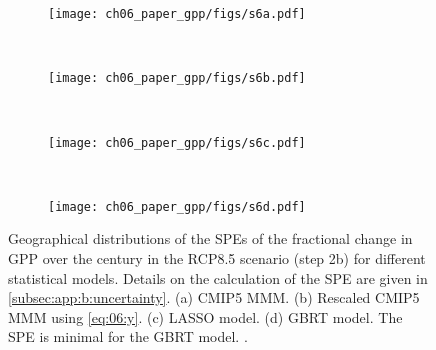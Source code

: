 \begin{figure}[p]
  \centering
  \begin{subfigure}[b]{\SubfigureWidth{}}
    \texttt{[image: ch06\_paper\_gpp/figs/s6a.pdf]}
    \caption{}
    \label{fig:app:b:step2b_results_errors:a}
  \end{subfigure}
  ~
  \begin{subfigure}[b]{\SubfigureWidth{}}
    \texttt{[image: ch06\_paper\_gpp/figs/s6b.pdf]}
    \caption{}
    \label{fig:app:b:step2b_results_errors:b}
  \end{subfigure}
  \\
  \begin{subfigure}[b]{\SubfigureWidth{}}
    \texttt{[image: ch06\_paper\_gpp/figs/s6c.pdf]}
    \caption{}
    \label{fig:app:b:step2b_results_errors:c}
  \end{subfigure}
  ~
  \begin{subfigure}[b]{\SubfigureWidth{}}
    \texttt{[image: ch06\_paper\_gpp/figs/s6d.pdf]}
    \caption{}
    \label{fig:app:b:step2b_results_errors:d}
  \end{subfigure}
  \caption[
    Geographical distributions of the \aclp{SPE} of the fractional change in
    \acf{GPP} over the  century in the \acs{RCP}8.5 scenario (step 2b)
    for different statistical models.
  ]{
    Geographical distributions of the \acfp{SPE} of the fractional change in
    \acf{GPP} over the  century in the \acs{RCP}8.5 scenario (step 2b)
    for different statistical models. Details on the calculation of the
    \acs{SPE} are given in \cref{subsec:app:b:uncertainty}. (a) \acs{CMIP}5
    \acf{MMM}. (b) Rescaled \acs{CMIP}5 \acs{MMM} using \cref{eq:06:y}. (c)
    \Acf{LASSO} model. (d) \Acf{GBRT} model. The \acs{SPE} is minimal for the
    \acs{GBRT} model. .
  }
  \label{fig:app:b:step2b_results_errors}
\end{figure}


\endgroup

